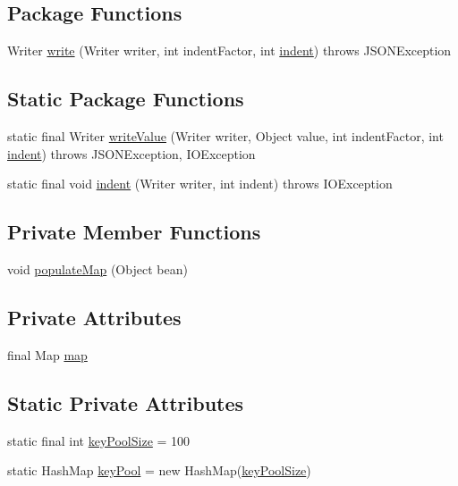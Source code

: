 \subsection*{Package Functions}
\begin{DoxyCompactItemize}
\item 
Writer \hyperlink{classorg_1_1json_1_1_j_s_o_n_object_afccc699dd9731cbee68c4e3efa8f45c8}{write} (Writer writer, int indent\-Factor, int \hyperlink{classorg_1_1json_1_1_j_s_o_n_object_ade4aa5090d5636a0318db80ba32764be}{indent})  throws J\-S\-O\-N\-Exception 
\end{DoxyCompactItemize}
\subsection*{Static Package Functions}
\begin{DoxyCompactItemize}
\item 
static final Writer \hyperlink{classorg_1_1json_1_1_j_s_o_n_object_a45a696bfd8f909a5b7afcefb71ed6f58}{write\-Value} (Writer writer, Object value, int indent\-Factor, int \hyperlink{classorg_1_1json_1_1_j_s_o_n_object_ade4aa5090d5636a0318db80ba32764be}{indent})  throws J\-S\-O\-N\-Exception, I\-O\-Exception 
\item 
static final void \hyperlink{classorg_1_1json_1_1_j_s_o_n_object_ade4aa5090d5636a0318db80ba32764be}{indent} (Writer writer, int indent)  throws I\-O\-Exception 
\end{DoxyCompactItemize}
\subsection*{Private Member Functions}
\begin{DoxyCompactItemize}
\item 
void \hyperlink{classorg_1_1json_1_1_j_s_o_n_object_ac10eaec5716b5868f263b0d101a7e164}{populate\-Map} (Object bean)
\end{DoxyCompactItemize}
\subsection*{Private Attributes}
\begin{DoxyCompactItemize}
\item 
final Map \hyperlink{classorg_1_1json_1_1_j_s_o_n_object_a88de444c62dae3f3193d1276bb87ba31}{map}
\end{DoxyCompactItemize}
\subsection*{Static Private Attributes}
\begin{DoxyCompactItemize}
\item 
static final int \hyperlink{classorg_1_1json_1_1_j_s_o_n_object_a982bf3253548748e80d16b1783a22ccc}{key\-Pool\-Size} = 100
\item 
static Hash\-Map \hyperlink{classorg_1_1json_1_1_j_s_o_n_object_a7bcba855d8493d0205256068ddd41314}{key\-Pool} = new Hash\-Map(\hyperlink{classorg_1_1json_1_1_j_s_o_n_object_a982bf3253548748e80d16b1783a22ccc}{key\-Pool\-Size})
\end{DoxyCompactItemize}


